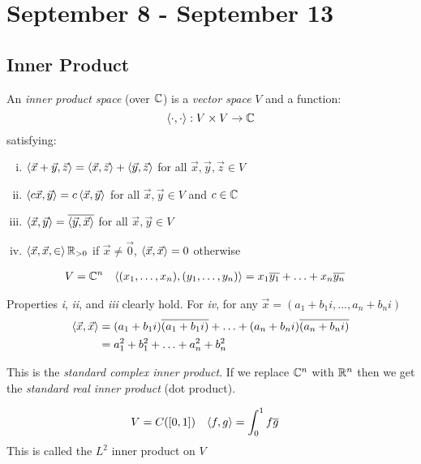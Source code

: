 \chapter{September 8 - September 13}

\section{Inner Product}
\begin{definition}
  An \emph{inner product space} (over $\mathbb{C}$) is a \emph{vector space} $V$ and a function:
  $$\left\langle \cdot , \cdot \right\rangle : V \times V \to \mathbb{C}$$
  satisfying:
  \begin{enumerate}[i.]
    \item $\left\langle \vec x + \vec y , \vec z \right\rangle = \left\langle \vec x , \vec z \right\rangle + \left\langle \vec y , \vec z \right\rangle$ for all $\vec x,\vec y,\vec z \in V$
    \item $\left\langle c\vec x , \vec y \right\rangle = c\left\langle \vec x , \vec y \right\rangle$ for all $\vec x,\vec y \in V$ and $c \in \mathbb{C}$
    \item $\left\langle \vec x , \vec y \right\rangle = \overline{\left\langle \vec y , \vec x \right\rangle}$ for all $\vec x, \vec y \in V$
    \item $\left\langle \vec x, \vec x , \in \right\rangle \mathbb{R}_{>0}$ if $\vec x \ne \vec 0$, $\left\langle \vec x , \vec x \right\rangle = 0$ otherwise
  \end{enumerate}
\end{definition}

\begin{defexample}
  \begin{align*}
  V &= \mathbb{C}^n & \left\langle (x_1,\ldots,x_n) , (y_1,\ldots,y_n) \right\rangle &= x_1\overline{y_1} + \ldots + x_n\overline{y_n}
  \end{align*}

  Properties \emph{i}, \emph{ii}, and \emph{iii} clearly hold.
  For \emph{iv}, for any $\vec x = (a_1 + b_1i, \ldots, a_n + b_ni)$
  \begin{align}
    \left\langle \vec x , \vec x \right\rangle &= (a_1 + b_1i)\overline{(a_1 + b_1i)} + \ldots + (a_n + b_ni)\overline{(a_n+b_ni)} \\
                         &= a_1^2 + b_1^2 + \ldots + a_n^2 + b_n^2
  \end{align}

  This is the \emph{standard complex inner product}.
  If we replace $\mathbb{C}^n$ with $\mathbb{R}^n$ then we get the \emph{standard real inner product} (dot product).
\end{defexample}

\begin{defexample}
  \begin{align*}
    V &= C([0,1]) & \left\langle f , g \right\rangle &= \int_0^1 f \overline{g}
  \end{align*}
  This is called the $L^2$ inner product on $V$
\end{defexample}

